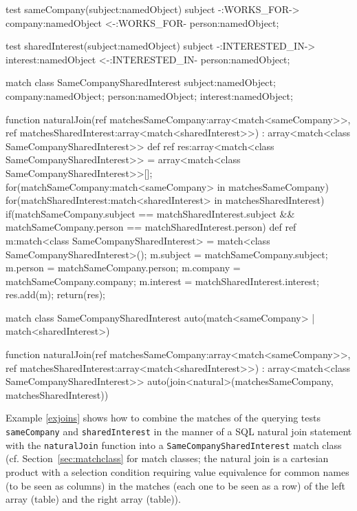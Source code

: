 \begin{example}
  \begin{grgen}
test sameCompany(subject:namedObject)
{
	subject -:WORKS_FOR-> company:namedObject <-:WORKS_FOR- person:namedObject;
}

test sharedInterest(subject:namedObject)
{
	subject -:INTERESTED_IN-> interest:namedObject <-:INTERESTED_IN- person:namedObject;
}

match class SameCompanySharedInterest
{
	subject:namedObject;
	company:namedObject;
	person:namedObject;
	interest:namedObject;
}

function naturalJoin(ref matchesSameCompany:array<match<sameCompany>>, ref matchesSharedInterest:array<match<sharedInterest>>) : array<match<class SameCompanySharedInterest>>
{
	def ref res:array<match<class SameCompanySharedInterest>> = array<match<class SameCompanySharedInterest>>[];
	for(matchSameCompany:match<sameCompany> in matchesSameCompany)
	{
		for(matchSharedInterest:match<sharedInterest> in matchesSharedInterest)
		{
			if(matchSameCompany.subject == matchSharedInterest.subject && matchSameCompany.person == matchSharedInterest.person) {
				def ref m:match<class SameCompanySharedInterest> = match<class SameCompanySharedInterest>();
				m.subject = matchSameCompany.subject;
				m.person = matchSameCompany.person;
				m.company = matchSameCompany.company;
				m.interest = matchSharedInterest.interest;
				res.add(m);
			}
		}
	}
	return(res);
}
  \end{grgen}\label{exjoins}
	
	\begin{grgen}
match class SameCompanySharedInterest
{
	auto(match<sameCompany> | match<sharedInterest>)
}

function naturalJoin(ref matchesSameCompany:array<match<sameCompany>>, ref matchesSharedInterest:array<match<sharedInterest>>) : array<match<class SameCompanySharedInterest>>
{
	auto(join<natural>(matchesSameCompany, matchesSharedInterest))
}
  \end{grgen}
\end{example}

Example \ref{exjoins} shows how to combine the matches of the querying tests \texttt{sameCompany} and \texttt{sharedInterest} in the manner of a SQL natural join statement with the \texttt{naturalJoin} function into a \texttt{SameCompanySharedInterest} match class (cf. Section~\ref{sec:matchclass} for match classes; the natural join is a cartesian product with a selection condition requiring value equivalence for common names (to be seen as columns) in the matches (each one to be seen as a row) of the left array (table) and the right array (table)).

